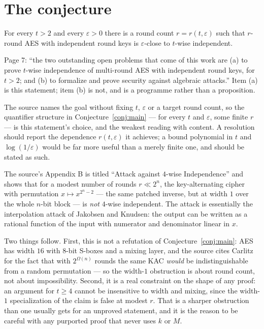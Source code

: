 \documentclass{conjura-conjecture}
\newcommand{\Om}{\Omega}
\newcommand{\eps}{\varepsilon}
\begin{document}
\section{The conjecture}\label{sec:conjectures}

\begin{conjecture}\label{conj:main}
For every $t > 2$ and every $\eps > 0$ there is a round count $r =
r(t,\eps)$ such that $r$-round AES with independent round keys is
$\eps$-close to $t$-wise independent.
\end{conjecture}

\begin{remark}\label{rem:framing}
Page 7: ``the two outstanding open problems that come of this work are
(a) to prove $t$-wise independence of multi-round AES with independent
round keys, for $t > 2$; and (b) to formalize and prove security against
algebraic attacks.'' Item (a) is this statement; item (b) is not, and is
a programme rather than a proposition.

The source names the goal without fixing $t$, $\eps$ or a target round
count, so the quantifier structure in Conjecture~\ref{conj:main} --- for
every $t$ and $\eps$, some finite $r$ --- is this statement's choice, and
the weakest reading with content. A resolution should report the
dependence $r(t,\eps)$ it achieves; a bound polynomial in $t$ and
$\log(1/\eps)$ would be far more useful than a merely finite one, and
should be stated as such.
\end{remark}

\begin{remark}\label{rem:attack}
The source's Appendix B is titled ``Attack against $4$-wise
Independence'' and shows that for a modest number of rounds $r \ll 2^{n}$,
the key-alternating cipher with permutation $x \mapsto x^{2^{n}-2}$ ---
the same patched inverse, but at width $1$ over the whole $n$-bit block
--- is \emph{not} $4$-wise independent. The attack is essentially the
interpolation attack of Jakobsen and Knudsen: the output can be written
as a rational function of the input with numerator and denominator linear
in $x$.

Two things follow. First, this is not a refutation of
Conjecture~\ref{conj:main}: AES has width $16$ with $8$-bit S-boxes and a
mixing layer, and the source cites Carlitz for the fact that with
$2^{\Om(n)}$ rounds the same KAC \emph{would} be indistinguishable from a
random permutation --- so the width-$1$ obstruction is about round count,
not about impossibility. Second, it is a real constraint on the shape of
any proof: an argument for $t \ge 4$ cannot be insensitive to width and
mixing, since the width-$1$ specialization of the claim is false at
modest $r$. That is a sharper obstruction than one usually gets for an
unproved statement, and it is the reason to be careful with any purported
proof that never uses $k$ or $M$.
\end{remark}
\end{document}
